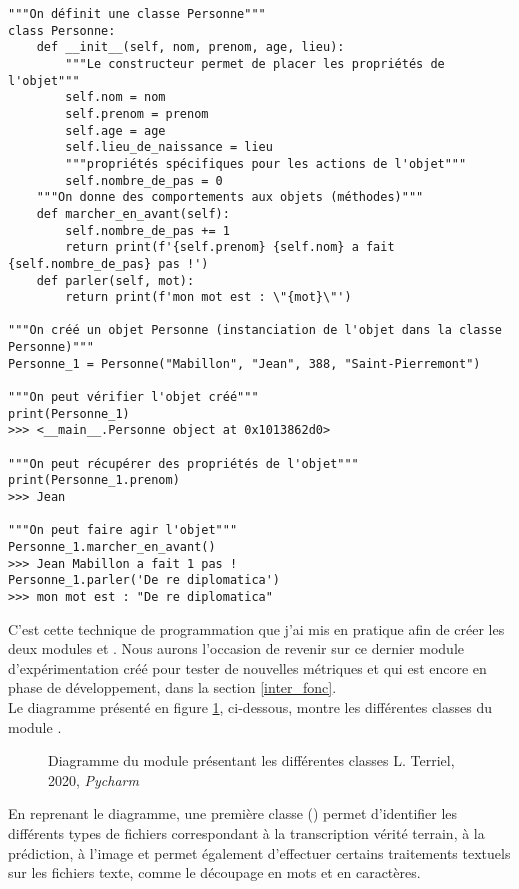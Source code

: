 \lstset{language=Python}
\begin{lstlisting}
"""On définit une classe Personne"""
class Personne:
    def __init__(self, nom, prenom, age, lieu):
        """Le constructeur permet de placer les propriétés de l'objet"""
        self.nom = nom
        self.prenom = prenom
        self.age = age
        self.lieu_de_naissance = lieu
        """propriétés spécifiques pour les actions de l'objet"""
        self.nombre_de_pas = 0
    """On donne des comportements aux objets (méthodes)"""
    def marcher_en_avant(self):
        self.nombre_de_pas += 1
        return print(f'{self.prenom} {self.nom} a fait {self.nombre_de_pas} pas !')
    def parler(self, mot):
        return print(f'mon mot est : \"{mot}\"')

"""On créé un objet Personne (instanciation de l'objet dans la classe Personne)"""
Personne_1 = Personne("Mabillon", "Jean", 388, "Saint-Pierremont")

"""On peut vérifier l'objet créé"""
print(Personne_1)
>>> <__main__.Personne object at 0x1013862d0>

"""On peut récupérer des propriétés de l'objet"""
print(Personne_1.prenom)
>>> Jean

"""On peut faire agir l'objet"""
Personne_1.marcher_en_avant()
>>> Jean Mabillon a fait 1 pas !
Personne_1.parler('De re diplomatica')
>>> mon mot est : "De re diplomatica"
\end{lstlisting}

C'est cette technique de programmation que j'ai mis en pratique afin de créer les deux modules  et . Nous aurons l'occasion de revenir sur ce dernier module d'expérimentation créé pour tester de nouvelles métriques et qui est encore en phase de développement, dans la section \ref{inter_fonc}.\\

Le diagramme présenté en figure \ref{fig:diag_synsem}, ci-dessous, montre les différentes classes du module 
.

\begin{figure}[H]
    \centering
    \centerline{}
    \caption{Diagramme du module  présentant les différentes classes \textcopyright L. Terriel, 2020, \textit{Pycharm}}
    \label{fig:diag_synsem}
\end{figure}

En reprenant le diagramme, une première classe () permet d'identifier les différents types de fichiers correspondant à la transcription vérité terrain, à la prédiction, à l'image et permet également d'effectuer certains traitements textuels sur les fichiers texte, comme le découpage en mots et en caractères. 

